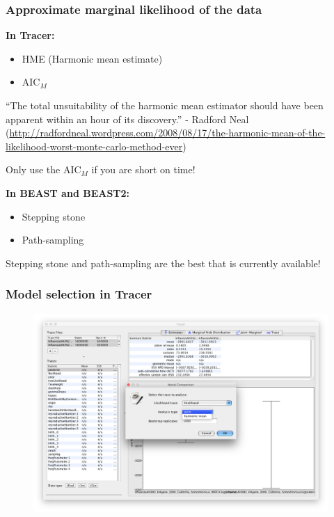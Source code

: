 \begin{frame}\frametitle{Approximate marginal likelihood of the data}

  \textbf{In Tracer:}

    \begin{itemize}
      \item HME (Harmonic mean estimate)
      \item AIC$_M$
    \end{itemize}

    \pause
    ``The total unsuitability of the harmonic mean estimator should have been apparent within an hour of its discovery.'' - Radford Neal \scriptsize{(\url{http://radfordneal.wordpress.com/2008/08/17/the-harmonic-mean-of-the-likelihood-worst-monte-carlo-method-ever})}
    
    \normalsize
    \pause
    \vspace{0.25cm}
    Only use the AIC$_M$ if you are short on time!
    \vspace{0.5cm}
  \pause

  \textbf{In BEAST and BEAST2:}
    \begin{itemize}
      \item Stepping stone
      \item Path-sampling
    \end{itemize}

    \pause
    Stepping stone and path-sampling are the best that is currently available!
\end{frame}

\begin{frame}\frametitle{Model selection in Tracer}

  \begin{figure}
      \includegraphics[width=\textwidth]{figures/TracerModelSelection}
  \end{figure}

\end{frame}

